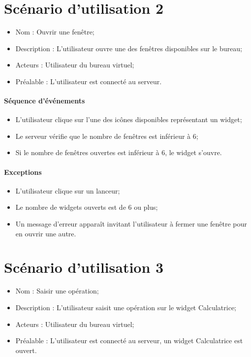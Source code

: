 
\section{Scénario d'utilisation 2}
\begin{itemize}
	\item Nom : Ouvrir une fenêtre;
	\item Description : L'utilisateur ouvre une des fenêtres disponibles sur le bureau;
	\item Acteurs : Utilisateur du bureau virtuel;
	\item Préalable : L'utilisateur est connecté au serveur.
\end{itemize}

\paragraph{Séquence d'événements}
\begin{itemize}
	\item L'utilisateur clique sur l'une des icônes disponibles représentant un widget;
	\item Le serveur vérifie que le nombre de fenêtres est inférieur à 6;
	\item Si le nombre de fenêtres ouvertes est inférieur à 6, le widget s'ouvre.
\end{itemize}

\paragraph{Exceptions}
\begin{itemize}
	\item L'utilisateur clique sur un lanceur;
	\item Le nombre de widgets ouverts est de 6 ou plus;
	\item Un message d'erreur apparaît invitant l'utilisateur à fermer une fenêtre pour en ouvrir une autre.
\end{itemize}


\section{Scénario d'utilisation 3}
\begin{itemize}
	\item Nom : Saisir une opération;
	\item Description : L'utilisateur saisit une opération sur le widget Calculatrice;
	\item Acteurs : Utilisateur du bureau virtuel;
	\item Préalable : L'utilisateur est connecté au serveur, un widget Calculatrice est ouvert.
\end{itemize}

